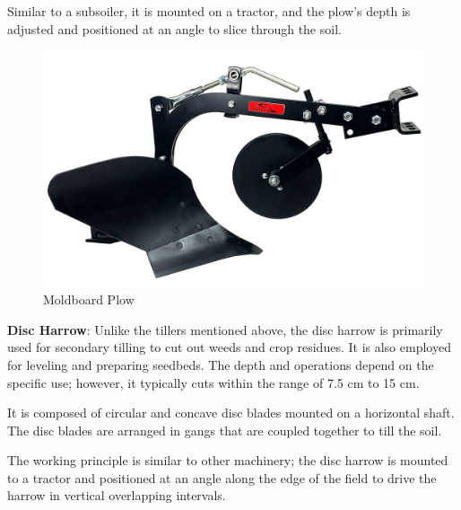 \documentclass{article}
\begin{document}
\begin{flushleft}
Similar to a subsoiler, it is mounted on a tractor, and the plow's depth is adjusted and positioned at an angle to slice through the soil.
\newline
\FloatBarrier
\begin{center}
    \begin{figure}[htbp]
        \centering
    \includegraphics[scale=0.2]{cultivating_tool/moadboadplow.jpg}
    \caption{Moldboard Plow}
    \end{figure}
    \end{center}
\FloatBarrier
\vspace*{3pt}

\textbf{Disc Harrow}: Unlike the tillers mentioned above, the disc harrow is primarily used for secondary tilling to cut out weeds and crop residues. It is also employed for leveling and preparing seedbeds. The depth and operations depend on the specific use; however, it typically cuts within the range of 7.5 cm to 15 cm.\newline

It is composed of circular and concave disc blades mounted on a horizontal shaft. The disc blades are arranged in gangs that are coupled together to till the soil. \newline

The working principle is similar to other machinery; the disc harrow is mounted to a tractor and positioned at an angle along the edge of the field to drive the harrow in vertical overlapping intervals. \newline
\newline 


\end{flushleft}
\end{document}
